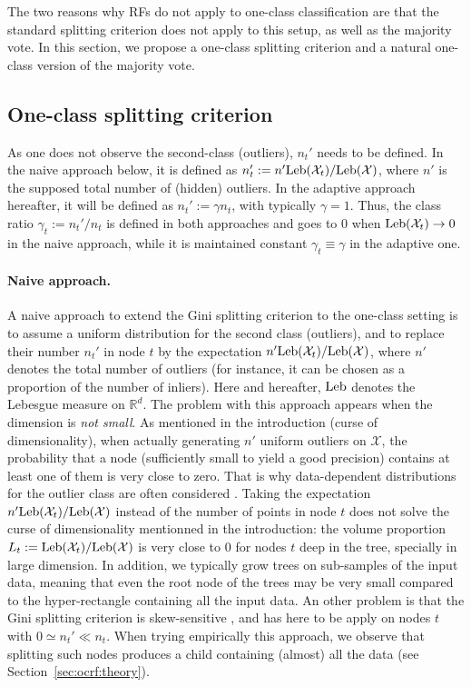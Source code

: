 The two reasons why RFs do not apply to one-class classification are that the standard splitting criterion does not apply to this setup, as well as the majority vote. In this section, we propose a one-class splitting criterion and a natural one-class version of the majority vote.


\subsection{One-class splitting criterion}
\label{sec:one-class-crit}
As one does not observe the second-class (outliers), $n_t'$ needs to be defined. In the naive approach below, it is defined as $n_t':= n' \text{Leb}(\mathcal{X}_t) / \text{Leb}(\mathcal{X})$, where $n'$ is the supposed total number of (hidden) outliers. In the adaptive approach hereafter, it will be defined as $n_t' := \gamma n_t$, with typically $\gamma=1$. Thus, the class ratio $\gamma_t := n_t'/n_t$ is defined in both approaches and goes to $0$ when $\text{Leb}(\mathcal{X}_t) \to 0$ in the naive approach, while it is maintained constant $\gamma_t \equiv \gamma$ in the adaptive one.
\paragraph{Naive approach.}
A naive approach to extend the Gini splitting criterion to the one-class setting is to assume a  uniform distribution for the second class (outliers), and to replace their number $n_t'$ in node $t$ by the expectation $n' \text{Leb}(\mathcal{X}_t) / \text{Leb}(\mathcal{X})$, where $n'$ denotes the total number of outliers (for instance, it can be chosen as a proportion of the number of inliers).
Here and hereafter, $\text{Leb}$ denotes the Lebesgue measure on $\mathbb{R}^d$.
%
The problem with this approach appears when the dimension is \emph{not small}. As mentioned in the introduction (curse of dimensionality),
when actually generating $n'$ uniform outliers on $\mathcal{X}$, the probability that a node (sufficiently small to yield a good precision) contains at least one of them is very close to zero. That is why data-dependent distributions for the outlier class are often considered \citep{Desir12, Shi2012}.
%
Taking the expectation $n' \text{Leb}(\mathcal{X}_t) / \text{Leb}(\mathcal{X})$ instead of the number of points in node $t$ does not solve the curse of dimensionality mentionned in the introduction:
the volume proportion $L_t:=\text{Leb}(\mathcal{X}_t) / \text{Leb}(\mathcal{X})$ is very close to $0$ for nodes $t$ deep in the tree, specially in large dimension.
%
In addition, we typically grow trees on sub-samples of the input data, meaning that even the root node of the trees may be very small compared to the hyper-rectangle containing all the input data.
%
An other problem is that the Gini splitting criterion is skew-sensitive \citep{Flach2003}, and has here to be apply on nodes $t$ with $0 \simeq n_t' \ll n_t$. When trying empirically this approach, we observe that splitting such nodes produces a child containing (almost) all the data (see Section~\ref{sec:ocrf:theory}).

